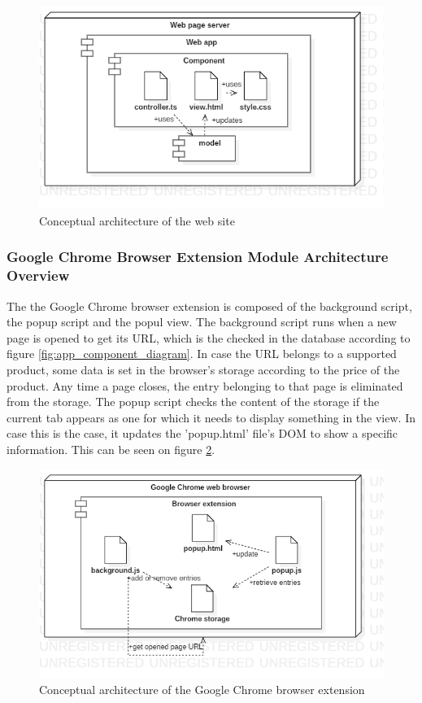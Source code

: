 \documentclass[12pt,a4paper,twoside]{report}
\begin{document}
\begin{figure}[ht]
  \centering
  \includegraphics[width=0.65\linewidth]{img/app_conceptual_architecture_site.png}
  \caption[]{Conceptual architecture of the web site}
  \label{fig:app_conceptual_architecture_site}
\end{figure}


\subsubsection{Google Chrome Browser Extension Module Architecture Overview}

The the Google Chrome browser extension is composed of the background script, the popup script and the popul view. The background script runs when a new page is opened to get its URL, which is the checked in the database according to figure \ref{fig:app_component_diagram}. In case the URL belongs to a supported product, some data is set in the browser's storage according to the price of the product. Any time a page closes, the entry belonging to that page is eliminated from the storage. The popup script checks the content of the storage if the current tab appears as one for which it needs to display something in the view. In case this is the case, it updates the 'popup.html' file's DOM to show a specific information. This can be seen on figure \ref{fig:app_conceptual_architecture_chrome_extension}.

\begin{figure}[ht]
  \centering
  \includegraphics[width=0.65\linewidth]{img/app_conceptual_architecture_chrome_extension.png}
  \caption[]{Conceptual architecture of the Google Chrome browser extension}
  \label{fig:app_conceptual_architecture_chrome_extension}
\end{figure}
\end{document}
